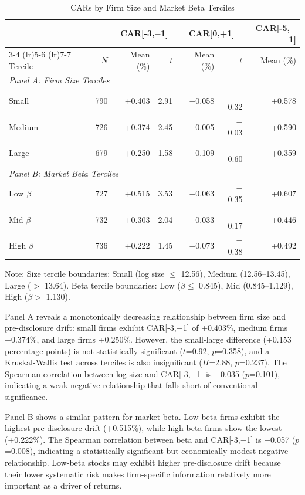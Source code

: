 \documentclass[manuscript,review]{acmart}
\begin{document}
\begin{table}[ht]
\caption{CARs by Firm Size and Market Beta Terciles}
\label{tab:size_beta}
\begin{tabular}{lrrrrrr}
\toprule
& & \multicolumn{2}{c}{CAR[-3,$-$1]} & \multicolumn{2}{c}{CAR[0,+1]} & {CAR[-5,$-$1]} \\
\cmidrule(lr){3-4} \cmidrule(lr){5-6} \cmidrule(lr){7-7}
Tercile & $N$ & Mean (\%) & $t$ & Mean (\%) & $t$ & Mean (\%) \\
\midrule
\multicolumn{7}{l}{\textit{Panel A: Firm Size Terciles}} \\
Small & 790 & +0.403 & 2.91 & $-$0.058 & $-$0.32 & +0.578 \\
Medium & 726 & +0.374 & 2.45 & $-$0.005 & $-$0.03 & +0.590 \\
Large & 679 & +0.250 & 1.58 & $-$0.109 & $-$0.60 & +0.359 \\
\midrule
\multicolumn{7}{l}{\textit{Panel B: Market Beta Terciles}} \\
Low $\beta$ & 727 & +0.515 & 3.53 & $-$0.063 & $-$0.35 & +0.607 \\
Mid $\beta$ & 732 & +0.303 & 2.04 & $-$0.033 & $-$0.17 & +0.446 \\
High $\beta$ & 736 & +0.222 & 1.45 & $-$0.073 & $-$0.38 & +0.492 \\
\bottomrule
\end{tabular}
\begin{flushleft}
\small Note: Size tercile boundaries: Small (log size $\leq$ 12.56), Medium (12.56--13.45), Large ($>$ 13.64). Beta tercile boundaries: Low ($\beta \leq$ 0.845), Mid (0.845--1.129), High ($\beta >$ 1.130).
\end{flushleft}
\end{table}

Panel A reveals a monotonically decreasing relationship between firm size and pre-disclosure drift: small firms exhibit CAR[-3,$-$1] of +0.403\%, medium firms +0.374\%, and large firms +0.250\%. However, the small-large difference (+0.153 percentage points) is not statistically significant ($t$=0.92, $p$=0.358), and a Kruskal-Wallis test across terciles is also insignificant ($H$=2.88, $p$=0.237). The Spearman correlation between log size and CAR[-3,$-$1] is $-$0.035 ($p$=0.101), indicating a weak negative relationship that falls short of conventional significance.

Panel B shows a similar pattern for market beta. Low-beta firms exhibit the highest pre-disclosure drift (+0.515\%), while high-beta firms show the lowest (+0.222\%). The Spearman correlation between beta and CAR[-3,$-$1] is $-$0.057 ($p$=0.008), indicating a statistically significant but economically modest negative relationship. Low-beta stocks may exhibit higher pre-disclosure drift because their lower systematic risk makes firm-specific information relatively more important as a driver of returns.
\end{document}
